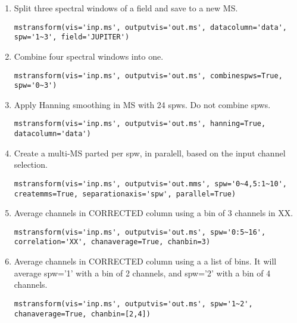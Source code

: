 \begin{enumerate}
\item Split three spectral windows of a field and save to a new MS.
\begin{verbatim}
mstransform(vis='inp.ms', outputvis='out.ms', datacolumn='data', spw='1~3', field='JUPITER')
\end{verbatim}
\item Combine four spectral windows into one.
\begin{verbatim}
mstransform(vis='inp.ms', outputvis='out.ms', combinespws=True, spw='0~3')
\end{verbatim}
\item Apply Hanning smoothing in MS with 24 spws. Do not combine spws.
\begin{verbatim}
mstransform(vis='inp.ms', outputvis='out.ms', hanning=True, datacolumn='data')
\end{verbatim}
\item Create a multi-MS parted per spw, in paralell, based on the input channel selection.
\begin{verbatim}
mstransform(vis='inp.ms', outputvis='out.mms', spw='0~4,5:1~10', createmms=True, separationaxis='spw', parallel=True)
\end{verbatim}
\item Average channels in CORRECTED column using a bin of 3 channels in XX.
\begin{verbatim}
mstransform(vis='inp.ms', outputvis='out.ms', spw='0:5~16', correlation='XX', chanaverage=True, chanbin=3)
\end{verbatim}
\item Average channels in CORRECTED column using a a list of bins. It will
average spw='1' with a bin of 2 channels, and spw='2' with a bin of 4 channels.
\begin{verbatim}
mstransform(vis='inp.ms', outputvis='out.ms', spw='1~2', chanaverage=True, chanbin=[2,4])
\end{verbatim}


\end{enumerate}
